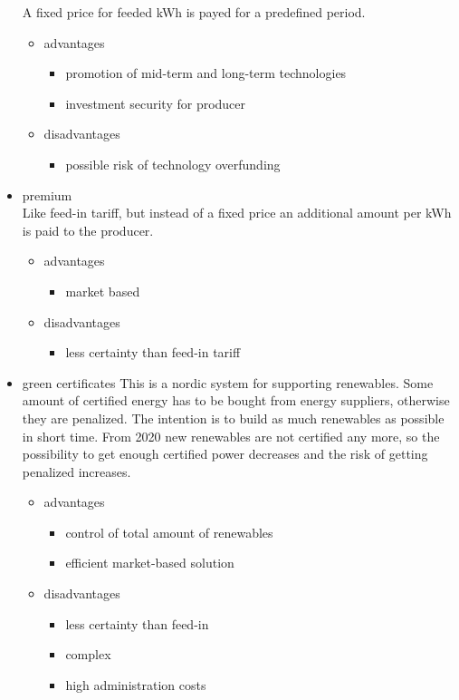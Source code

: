 \documentclass{article}
\begin{document}
\begin{itemize}
A fixed price for feeded kWh is payed for a predefined period.
\begin{itemize}
\item advantages
\begin{itemize}
\item promotion of mid-term and long-term technologies
\item investment security for producer
\end{itemize}
\item disadvantages
\begin{itemize}
\item possible risk of technology overfunding
\end{itemize}
\end{itemize}
\item premium\\
Like feed-in tariff, but instead of a fixed price an additional amount per kWh is paid to the producer.
\begin{itemize}
\item advantages
\begin{itemize}
\item market based
\end{itemize}
\item disadvantages
\begin{itemize}
\item less certainty than feed-in tariff
\end{itemize}
\end{itemize}
\item green certificates
This is a nordic system for supporting renewables. Some amount of certified energy has to be bought from energy suppliers, otherwise they are penalized. The intention is to build as much renewables as possible in short time. From 2020 new renewables are not certified any more, so the possibility to get enough certified power decreases and the risk of getting penalized increases.
\begin{itemize}
\item advantages
\begin{itemize}
\item control of total amount of renewables
\item efficient market-based solution
\end{itemize}
\item disadvantages
\begin{itemize}
\item less certainty than feed-in
\item complex
\item high administration costs
\end{itemize}
\end{itemize}
\end{itemize}
\end{document}
